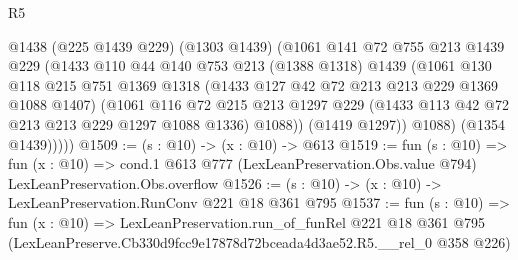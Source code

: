 \begin{lexlean}{R5}
\begin{coremodule}
          @1438
            (@225 @1439 @229)
            (@1303 @1439)
            (@1061
              @141
              @72
              @755
              @213
              @1439
              @229
              (@1433
                @110
                @44
                @140
                @753
                @213
                (@1388 @1318)
                @1439
                (@1061
                  @130
                  @118
                  @215
                  @751
                  @1369
                  @1318
                  (@1433 @127 @42 @72 @213 @213 @229 @1369 @1088 @1407)
                  (@1061
                    @116
                    @72
                    @215
                    @213
                    @1297
                    @229
                    (@1433 @113 @42 @72 @213 @213 @229 @1297 @1088 @1336)
                    @1088))
                (@1419 @1297))
              @1088)
            (@1354 @1439)))))
@1509 := (s : @10) -> (x : @10) -> @613
@1519 := fun (s : @10) =>
  fun (x : @10) =>
  cond.{1} @613 @777 (LexLeanPreservation.Obs.value @794) LexLeanPreservation.Obs.overflow
@1526 := (s : @10) -> (x : @10) -> LexLeanPreservation.RunConv @221 @18 @361 @795
@1537 := fun (s : @10) =>
  fun (x : @10) =>
  LexLeanPreservation.run_of_funRel
    @221
    @18
    @361
    @795
    (LexLeanPreserve.Cb330d9fcc9e17878d72bceada4d3ae52.R5.__rel_0 @358 @226)
\end{coremodule}
\end{lexlean}
